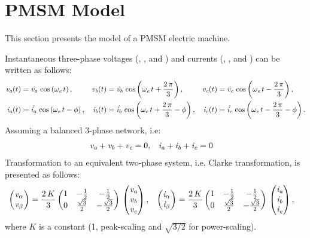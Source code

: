 \section{PMSM Model}
This section presents the model of a PMSM electric machine. 

Instantaneous three-phase voltages (\va, \vb, and \vc) and currents (\ia, \ib , and \ic) can be written as follows:
\begin{align*}
	\va(t) &= \hat\va\,\cos\left(\we\,t\right), & \vb(t) &= \hat\vb\,\cos\left(\we\,t + \frac{2\,\pi}{3}\right), & \vc(t) &= \hat\vc\,\cos\left(\we\,t - \frac{2\,\pi}{3}\right), \\
	\ia(t) &= \hat\ia\,\cos\left(\we\,t - \phi\right), & \ib(t) &= \hat\ib\,\cos\left(\we\,t + \frac{2\,\pi}{3} - \phi\right), & \ic(t) &= \hat\ic\,\cos\left(\we\,t - \frac{2\,\pi}{3} - \phi\right).
\end{align*}
Assuming a balanced 3-phase network, i.e:
\begin{align*}
	\va + \vb + \vc &= 0, & \ia + \ib + \ic &=0
\end{align*}
Transformation to an equivalent two-phase system, i.e, Clarke transformation, is presented as follows: 
\begin{align*}
	\begin{pmatrix}
		\valpha \\
		\vbeta
	\end{pmatrix} &= \frac{2\,K}{3} \begin{pmatrix}
										1 & -\frac{1}{2} & -\frac{1}{2} \\
										0 & \frac{\sqrt3}{2} & -\frac{\sqrt{3}}{2} \\
									\end{pmatrix}\, \begin{pmatrix}
														\va \\
														\vb \\
														\vc
													\end{pmatrix}, & 	\begin{pmatrix}
													\ialpha \\
													\ibeta
												\end{pmatrix} &= \frac{2\,K}{3} \begin{pmatrix}
												1 & -\frac{1}{2} & -\frac{1}{2} \\
												0 & \frac{\sqrt3}{2} & -\frac{\sqrt{3}}{2} \\
											\end{pmatrix}\, \begin{pmatrix}
											\ia \\
											\ib \\
											\ic
										\end{pmatrix},
\end{align*}
where $K$ is a constant (1, peak-scaling and $\sqrt{3/2}$ for power-scaling).

